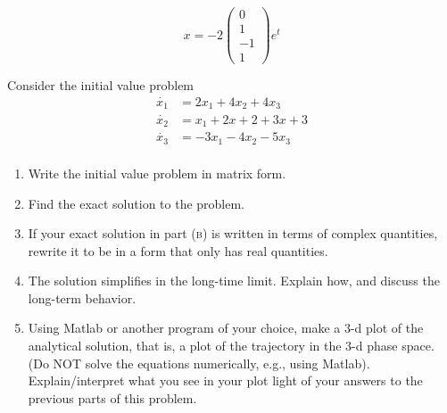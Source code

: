 \documentclass[11pt,answers]{exam}
\begin{document}
\begin{questions}
\begin{solution}
\[
x = -2\left(\begin{array}{c}0 \\ 1 \\ -1 \\ 1\end{array}\right)e^{t}
\]
\end{solution}
\item Consider the initial value problem
\begin{align*}
\dot{x_1} &= 2x_1 + 4x_2 + 4x_3\\
\dot{x_2} &= x_1 + 2x+2 + 3x+3\\
\dot{x_3} &= -3x_1 -4x_2 - 5x_3\\
\end{align*}
\begin{enumerate}
\item Write the initial value problem in matrix form.
\item Find the exact solution to the problem.
\item If your exact solution in part \textsc{(b)} is written in terms of complex quantities, rewrite it to be in a form that only has real quantities.
\item The solution simplifies in the long-time limit. Explain how, and discuss the long-term behavior.
\item Using Matlab or another program of your choice, make a 3-d plot of the analytical solution, that is, a plot of the trajectory in the 3-d phase space. (Do NOT solve the equations numerically, e.g., using Matlab). Explain/interpret what you see in your plot light of your answers to the previous parts of this problem.
\end{enumerate}


\end{questions}
\end{document}

